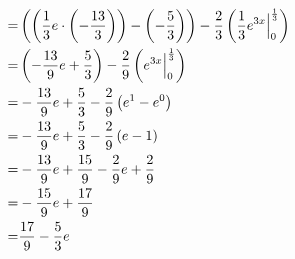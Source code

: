 \documentclass[11pt, a4paper]{article}
\providecommand\br[1]{\left(#1\right)}
\begin{document}
\begin{align*}
=& \br{\br{\frac{1}{3}e \cdot \br{-\frac{13}{3}}} - \br{-\frac{5}{3}}} - \frac{2}{3}\br{\frac{1}{3}e^{3x}\Big\vert_\lowerBorder^\upperBorder}\\
=& \br{-\frac{13}{9}e + \frac{5}{3}} - \frac{2}{9} \br{e^{3x}\Big\vert_\lowerBorder^\upperBorder}\\
=& -\frac{13}{9}e + \frac{5}{3} - \frac{2}{9} \br{e^1 - e^0}\\
=& -\frac{13}{9}e + \frac{5}{3} - \frac{2}{9} \br{e - 1}\\
=& -\frac{13}{9}e + \frac{15}{9} - \frac{2}{9}e + \frac{2}{9}\\
=& -\frac{15}{9}e + \frac{17}{9}\\
=& \frac{17}{9} - \frac{5}{3}e
\end{align*}
\end{document}
